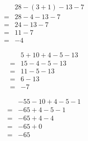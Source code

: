 \begin{multicols}{3}
    \begin{align*}
        &28-(3+1)-13-7\\
        =&28-4-13-7\\
        =&24-13-7\\
        =&11-7\\
        =&-4
    \end{align*}

    \begin{align*}
        &5+10+ 4-5-13\\
        =&15-4-5-13\\
        =&11-5-13\\
        =&6-13\\
        =&-7
    \end{align*}

    \begin{align*}
        &-55-10+ 4-5-1\\
        =&-65+4-5-1\\
        =&-65+4-4\\
        =&-65+0\\
        =&-65
    \end{align*}
\end{multicols}